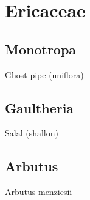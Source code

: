 
\chapter{Ericaceae}

\section{Monotropa}

Ghost pipe (uniflora)

\section{Gaultheria}

Salal (shallon)

\section{Arbutus}

Arbutus menziesii
